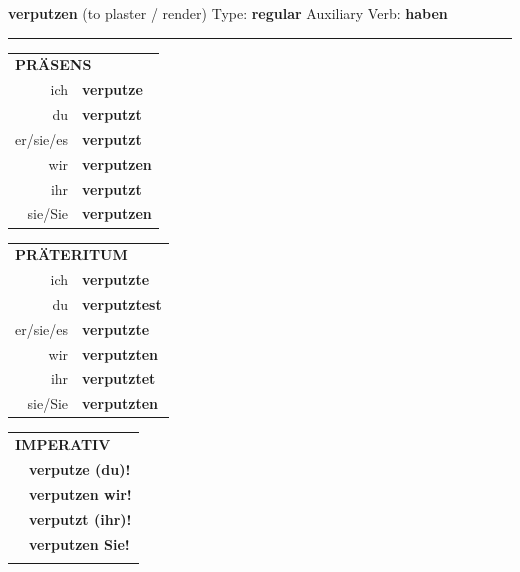 \documentclass[10pt,a4paper]{revtex4-2}
\begin{document}
\begin{verbbox}
    {\Large \bf verputzen} (to plaster / render) \hfill Type: \textbf{regular} \hfill Auxiliary Verb: \textbf{haben} 
    
     \vspace{5pt}

    \hrule
    
    \vspace{5pt}

  \begin{tabular}{rl}
     \multicolumn{2}{l}{\textbf{PRÄSENS} }\\
    ich & \textbf{verputze}\\
    du & \textbf{verputzt}\\
    er/sie/es & \textbf{verputzt}\\
    wir & \textbf{verputzen}\\
    ihr & \textbf{verputzt}\\
    sie/Sie & \textbf{verputzen}\\
  \end{tabular}
  \hfill
  \begin{tabular}{rl}
    \multicolumn{2}{l}{\textbf{PRÄTERITUM} }\\
    ich & \textbf{verputzte}\\
    du & \textbf{verputztest}\\
    er/sie/es & \textbf{verputzte}\\
    wir & \textbf{verputzten}\\
    ihr & \textbf{verputztet}\\
    sie/Sie & \textbf{verputzten}\\
  \end{tabular}
  \hfill
  \begin{tabular}{rl}
     \multicolumn{2}{l}{\textbf{IMPERATIV} }\\
   & \textbf{verputze (du)!}\\
   & \textbf{verputzen wir!}\\
   & \textbf{verputzt (ihr)!}\\
   & \textbf{verputzen Sie!}\\
   & \vspace{10pt}
  \end{tabular}

 \vspace{10pt}


\end{verbbox}
\end{document}

